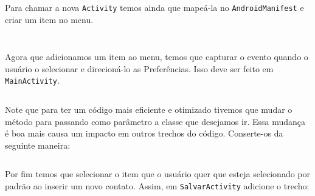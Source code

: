 \begin{listing}[H]
  \inputminted[linenos=true,frame=bottomline,tabsize=3]{ java }{ source/EditarPreferencias-1.java }
  \caption{Activity para mostrar preferências [EditarPreferencias.java]}
\end{listing}

Para chamar a nova \texttt{Activity} temos ainda que mapeá-la no \texttt{AndroidManifest} e criar
um item no menu.

\begin{listing}[H]
  \inputminted[linenos=true,frame=bottomline,tabsize=3]{ xml }{ source/AndroidManifest-4.xml }
  \caption{Mapeando Activity EditarPreferencias [AndroidManifest.xml]}
\end{listing}

\begin{listing}[H]
  \inputminted[linenos=true,frame=bottomline,tabsize=3]{ xml }{ source/main_menu-2.xml }
  \caption{Adicionar item Preferências ao menu principal [res/menu/main\b{ }menu.xml]}
\end{listing}

Agora que adicionamos um item ao menu, temos que capturar o evento quando o usuário o selecionar
e direcioná-lo as Preferências. Isso deve ser feito em \texttt{MainActivity}.

\begin{listing}[H]
  \inputminted[linenos=true,frame=bottomline,tabsize=3]{ java }{ source/MainActivity-12.java }
  \caption{Ir para Preferências pelo menu principal [MainActivity.java]}
\end{listing}

Note que para ter um código mais eficiente e otimizado tivemos que mudar o método 
para  passando como parâmetro a classe que desejamos ir. Essa mudança é boa mais causa
um impacto em outros trechos do código. Conserte-os da seguinte maneira:

\begin{listing}[H]
  \inputminted[linenos=true,frame=bottomline,tabsize=3]{ java }{ source/MainActivity-13.java }
  \caption{Mudança em método irParaSalvar [MainActivity.java]}
\end{listing}

Por fim temos que selecionar o item que o usuário quer que esteja selecionado por padrão ao inserir
um novo contato. Assim, em \texttt{SalvarActivity} adicione o trecho:

